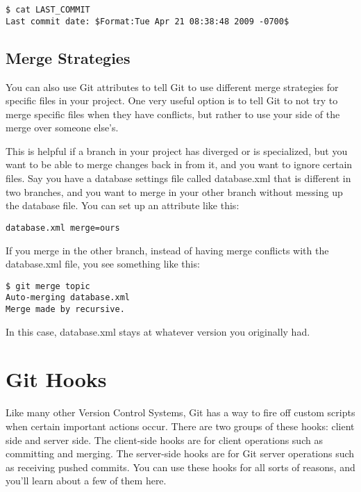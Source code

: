 \documentclass[a4paper]{book}
\newcounter{tab}[chapter]
\begin{document}
\begin{shaded}\begin{verbatim}
$ cat LAST_COMMIT
Last commit date: $Format:Tue Apr 21 08:38:48 2009 -0700$
\end{verbatim}\end{shaded}

\subsection{Merge Strategies}

You can also use Git attributes to tell Git to use different merge strategies for specific files in your project. One very useful option is to tell Git to not try to merge specific files when they have conflicts, but rather to use your side of the merge over someone else's.

This is helpful if a branch in your project has diverged or is specialized, but you want to be able to merge changes back in from it, and you want to ignore certain files. Say you have a database settings file called database.xml that is different in two branches, and you want to merge in your other branch without messing up the database file. You can set up an attribute like this:

\begin{shaded}\begin{verbatim}
database.xml merge=ours
\end{verbatim}\end{shaded}

If you merge in the other branch, instead of having merge conflicts with the database.xml file, you see something like this:

\begin{shaded}\begin{verbatim}
$ git merge topic
Auto-merging database.xml
Merge made by recursive.
\end{verbatim}\end{shaded}

In this case, database.xml stays at whatever version you originally had.

\section{Git Hooks}

Like many other Version Control Systems, Git has a way to fire off custom scripts when certain important actions occur. There are two groups of these hooks: client side and server side. The client-side hooks are for client operations such as committing and merging. The server-side hooks are for Git server operations such as receiving pushed commits. You can use these hooks for all sorts of reasons, and you'll learn about a few of them here.
\end{document}

